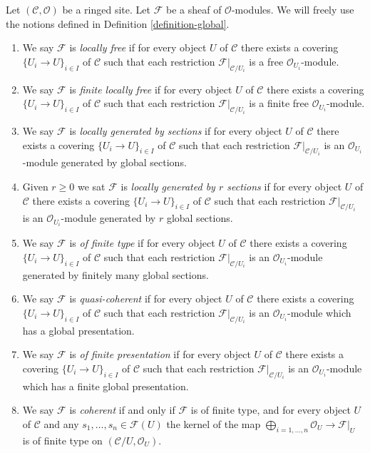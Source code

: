 \begin{definition}
\label{definition-site-local}
Let $(\mathcal{C}, \mathcal{O})$ be a ringed site.
Let $\mathcal{F}$ be a sheaf of $\mathcal{O}$-modules.
We will freely use the notions defined in
Definition \ref{definition-global}.
\begin{enumerate}
\item We say $\mathcal{F}$ is {\it locally free}
if for every object $U$ of $\mathcal{C}$ there exists a covering
$\{U_i \to U\}_{i \in I}$ of $\mathcal{C}$ such that each restriction
$\mathcal{F}|_{\mathcal{C}/U_i}$ is a free
$\mathcal{O}_{U_i}$-module.
\item We say $\mathcal{F}$ is {\it finite locally free}
if for every object $U$ of $\mathcal{C}$ there exists a covering
$\{U_i \to U\}_{i \in I}$ of $\mathcal{C}$ such that each restriction
$\mathcal{F}|_{\mathcal{C}/U_i}$ is a finite free
$\mathcal{O}_{U_i}$-module.
\item We say $\mathcal{F}$ is {\it locally generated by sections}
if for every object $U$ of $\mathcal{C}$ there exists a covering
$\{U_i \to U\}_{i \in I}$ of $\mathcal{C}$ such that each restriction
$\mathcal{F}|_{\mathcal{C}/U_i}$ is an
$\mathcal{O}_{U_i}$-module generated by global sections.
\item Given $r \geq 0$ we sat $\mathcal{F}$ is {\it locally generated
by $r$ sections} if for every object $U$ of $\mathcal{C}$ there exists
a covering $\{U_i \to U\}_{i \in I}$ of $\mathcal{C}$ such that each
restriction $\mathcal{F}|_{\mathcal{C}/U_i}$ is an
$\mathcal{O}_{U_i}$-module generated by $r$ global sections.
\item We say $\mathcal{F}$ is {\it of finite type}
if for every object $U$ of $\mathcal{C}$ there exists a covering
$\{U_i \to U\}_{i \in I}$ of $\mathcal{C}$ such that each restriction
$\mathcal{F}|_{\mathcal{C}/U_i}$ is an
$\mathcal{O}_{U_i}$-module generated by finitely many global sections.
\item We say $\mathcal{F}$ is {\it quasi-coherent}
if for every object $U$ of $\mathcal{C}$ there exists a covering
$\{U_i \to U\}_{i \in I}$ of $\mathcal{C}$ such that each restriction
$\mathcal{F}|_{\mathcal{C}/U_i}$ is an
$\mathcal{O}_{U_i}$-module which has a global presentation.
\item We say $\mathcal{F}$ is {\it of finite presentation}
if for every object $U$ of $\mathcal{C}$ there exists a covering
$\{U_i \to U\}_{i \in I}$ of $\mathcal{C}$ such that each restriction
$\mathcal{F}|_{\mathcal{C}/U_i}$ is an
$\mathcal{O}_{U_i}$-module which has a finite global presentation.
\item We say $\mathcal{F}$ is {\it coherent} if and only if
$\mathcal{F}$ is of finite type, and for every object
$U$ of $\mathcal{C}$ and any $s_1, \ldots, s_n \in \mathcal{F}(U)$
the kernel of the map
$\bigoplus_{i = 1, \ldots, n} \mathcal{O}_U \to \mathcal{F}|_U$
is of finite type on $(\mathcal{C}/U, \mathcal{O}_U)$.
\end{enumerate}
\end{definition}

